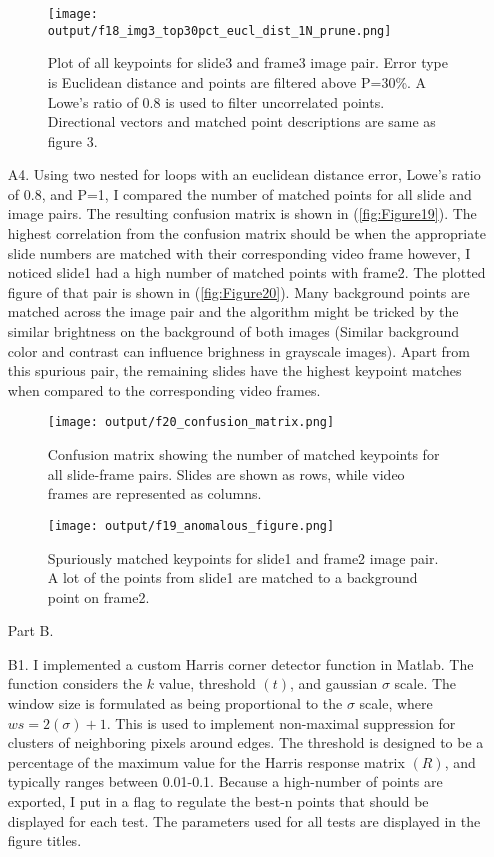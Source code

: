 \documentclass[12pt]{report}
\begin{document}
\begin{enumerate}
    \begin{figure}[H]
        \centering
        \texttt{[image: output/f18\_img3\_top30pct\_eucl\_dist\_1N\_prune.png]}
        \caption{Plot of all keypoints for slide3 and frame3 image pair. Error type is Euclidean distance and points are filtered above P=30\%. A Lowe's ratio of 0.8 
        is used to filter uncorrelated points. Directional vectors and matched point descriptions are same as figure 3.}
        \label{fig:Figure18}
    \end{figure}

    \item[A4.] Using two nested for loops with an euclidean distance error, Lowe's ratio of 0.8, and P=1, I compared the number of matched points for all slide and image 
    pairs. The resulting confusion matrix is shown in (\autoref{fig:Figure19}). The highest correlation from the confusion matrix should be when the appropriate slide numbers 
    are matched with their corresponding video frame however, I noticed slide1 had a high number of matched points with frame2. The plotted figure of that pair is shown in 
    (\autoref{fig:Figure20}). Many background points are matched across the image pair and the algorithm might be tricked by the similar brightness on the background of 
    both images (Similar background color and contrast can influence brighness in grayscale images). Apart from this spurious pair, the remaining slides have the highest 
    keypoint matches when compared to the corresponding video frames.

    \begin{figure}[H]
        \centering
        \texttt{[image: output/f20\_confusion\_matrix.png]}
        \caption{Confusion matrix showing the number of matched keypoints for all slide-frame pairs. Slides are shown as rows, while video frames are represented as columns.}
        \label{fig:Figure19}
    \end{figure}

    \begin{figure}[H]
        \centering
        \texttt{[image: output/f19\_anomalous\_figure.png]}
        \caption{Spuriously matched keypoints for slide1 and frame2 image pair. A lot of the points from slide1 are matched to a background point on frame2.}
        \label{fig:Figure20}
    \end{figure}

    \item[Part B.]
    \item[B1.] I implemented a custom Harris corner detector function in Matlab. The function considers the $k$ value, threshold $(t)$, and gaussian $\sigma$ scale. The 
    window size is formulated as being proportional to the $\sigma$ scale, where $ws = 2(\sigma) + 1$. This is used to implement non-maximal suppression for clusters of 
    neighboring pixels around edges. The threshold is designed to be a percentage of the maximum value for the Harris response matrix $(R)$, and typically ranges between 
    0.01-0.1. Because a high-number of points are exported, I put in a flag to regulate the best-n points that should be displayed for each test. The parameters used for 
    all tests are displayed in the figure titles.  


\end{enumerate}
\end{document}
